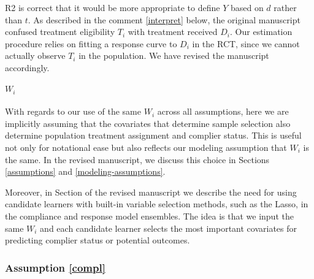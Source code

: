 \documentclass[hidelinks,12pt,letterpaper]{article}
\begin{document}
R2 is correct that it would be more appropriate to define $Y$ based on $d$ rather than $t$. As described in the comment \ref{interpret} below, the original manuscript confused treatment eligibility $T_i$ with treatment received $D_i$. Our estimation procedure relies on fitting a response curve to $D_i$ in the RCT, since we cannot actually observe $T_i$ in the population. We have revised the manuscript accordingly. 

\paragraph{$W_i$} \label{Wi}

With regards to our use of the same $W_i$ across all assumptions, here we are implicitly assuming that the covariates that determine sample selection also determine population treatment assignment and complier status. This is useful not only for notational ease but also reflects our modeling assumption that $W_i$ is the same. In the revised manuscript, we discuss this choice in Sections \ref{assumptions} and \ref{modeling-assumptions}. 

Moreover, in Section \label{ensemble} of the revised manuscript we describe the need for using candidate learners with built-in variable selection methods, such as the Lasso, in the compliance and response model ensembles. The idea is that we input the same $W_i$ and each candidate learner selects the most important covariates for predicting complier status or potential outcomes. 

\subsubsection{Assumption \ref{compl}}

\end{document}
